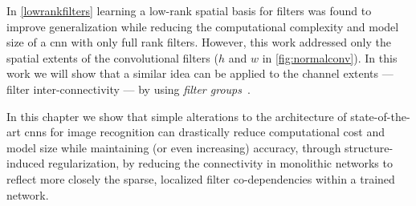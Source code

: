 \documentclass[thesis]{subfiles}
\begin{document}
	In \cref{lowrankfilters} learning a low-rank spatial basis for filters was found to improve generalization while reducing the computational complexity and model size of a \gls{cnn} with only full rank filters. However, this work addressed only the spatial extents of the convolutional filters (\ie $h$ and $w$ in \cref{fig:normalconv}). In this work we will show that a similar idea can be applied to the channel extents --- \ie filter inter-connectivity --- by using \emph{filter groups}~\citep{Krizhevsky2012}. 
	
	
	
	
	In this chapter we show that simple alterations to the architecture of state-of-the-art \glspl{cnn} for image recognition can drastically reduce computational cost and model size while maintaining (or even increasing) accuracy, through structure-induced regularization, by reducing the connectivity in monolithic networks to reflect more closely the sparse, localized filter co-dependencies within a trained network.
	
\end{document}
